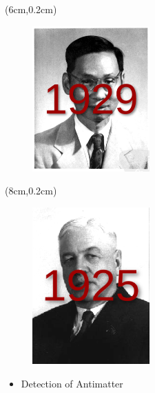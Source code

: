 \documentclass[hyperref={pdfpagelabels=false}]{beamer}
\begin{document}
\begin{frame}[label=]
\begin{textblock*}{5cm}(6cm,0.2cm) %
\begin{figure}[H] 
  \centering
\includegraphics[width=0.4\textwidth]{../imgs/cchaop.jpg}
\label{fig:cchaopjpg}
  \end{figure}


\end{textblock*}

\begin{textblock*}{5cm}(8cm,0.2cm) %
\begin{figure}[H] 
  \centering
\includegraphics[width=0.4\textwidth]{../imgs/skobelp.png}
\label{fig:skobelppng}
  \end{figure}


\end{textblock*}







\vspace{3cm}
\begin{itemize}

    \item Detection of Antimatter


\end{itemize}
\end{frame}
\end{document}
